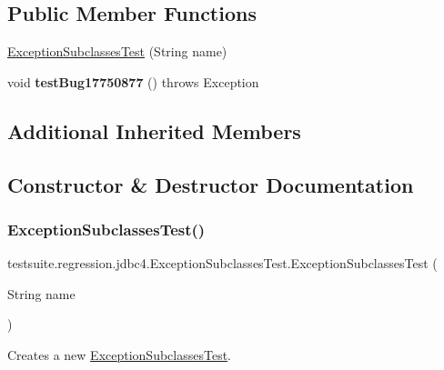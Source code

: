 \subsection*{Public Member Functions}
\begin{DoxyCompactItemize}
\item 
\mbox{\hyperlink{classtestsuite_1_1regression_1_1jdbc4_1_1_exception_subclasses_test_ad197cc9567240d429f78183a23a1edc4}{Exception\+Subclasses\+Test}} (String name)
\item 
\mbox{\label{classtestsuite_1_1regression_1_1jdbc4_1_1_exception_subclasses_test_a6f5fbbee1dec4b4b983b0279a1baeda1}} 
void {\bfseries test\+Bug17750877} ()  throws Exception 
\end{DoxyCompactItemize}
\subsection*{Additional Inherited Members}


\subsection{Constructor \& Destructor Documentation}
\mbox{\label{classtestsuite_1_1regression_1_1jdbc4_1_1_exception_subclasses_test_ad197cc9567240d429f78183a23a1edc4}} 
\subsubsection{\texorpdfstring{Exception\+Subclasses\+Test()}{ExceptionSubclassesTest()}}
{\footnotesize\ttfamily testsuite.\+regression.\+jdbc4.\+Exception\+Subclasses\+Test.\+Exception\+Subclasses\+Test (\begin{DoxyParamCaption}\item[{String}]{name }\end{DoxyParamCaption})}

Creates a new \mbox{\hyperlink{classtestsuite_1_1regression_1_1jdbc4_1_1_exception_subclasses_test}{Exception\+Subclasses\+Test}}.


